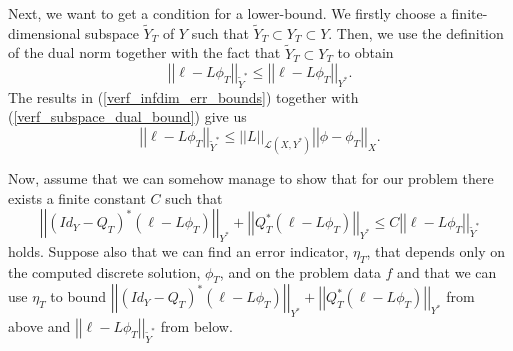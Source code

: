 \documentclass[12pt,a4paper]{article}
\theoremstyle{definition}
\begin{document}
Next, we want to get a condition for a lower-bound.  We firstly choose a finite-dimensional subspace $\widetilde{Y}_T$ of $Y$ such that $\widetilde{Y}_T\subset Y_T\subset Y$.  Then, we use the definition of the dual norm 
together with the fact that $\widetilde{Y}_T\subset Y_T$ to obtain
\begin{equation}\label{verf_subspace_dual_bound}
\left|\left| \ell-L\phi_T\right|\right|_{\widetilde{Y}^*}\leq \left|\left| \ell-L\phi_T\right|\right|_{Y^*}.
\end{equation}
The results in (\ref{verf_infdim_err_bounds}) together with (\ref{verf_subspace_dual_bound}) give us
\begin{equation}
\left|\left| \ell-L\phi_T\right|\right|_{\widetilde{Y}^*}\leq \left|\left|L\right|\right|_{\mathcal{L}\left(X,Y^*\right)}\left|\left|\phi-\phi_T\right|\right|_X.
\end{equation}

Now, assume that we can somehow manage to show that for our problem there exists a finite constant $C$ such that
\begin{equation}
\left|\left| \left(Id_Y-Q_T\right)^*\left(\ell-L\phi_T\right)\right|\right|_{Y^*} +\left|\left| Q_T^*\left(\ell-L\phi_T\right)\right|\right|_{Y^*}\leq C \left|\left| \ell-L\phi_T\right|\right|_{\widetilde{Y}^*}
\end{equation}
holds. Suppose also that we can find an error indicator, $\eta_T$, that depends only on the computed discrete solution, $\phi_T$, and on the problem data $f$ and that we can use $\eta_T$ to bound $\left|\left| \left(Id_Y-Q_T\right)^*\left(\ell-L\phi_T\right)\right|\right|_{Y^*} +\left|\left| Q_T^*\left(\ell-L\phi_T\right)\right|\right|_{Y^*}$ from above and $\left|\left| \ell-L\phi_T\right|\right|_{\widetilde{Y}^*}$ from below.  
\end{document}
